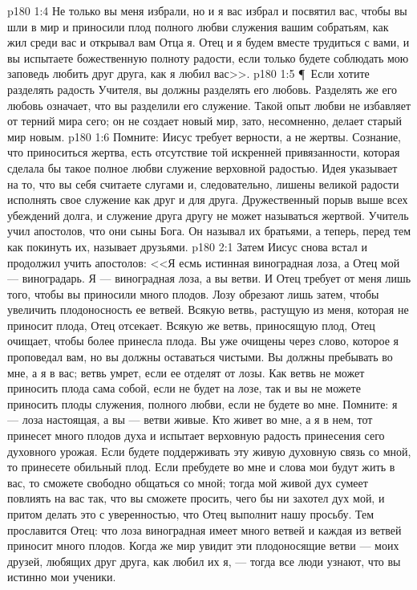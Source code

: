 \vs p180 1:4 Не только вы меня избрали, но и я вас избрал и посвятил вас, чтобы вы шли в мир и приносили плод полного любви служения вашим собратьям, как жил среди вас и открывал вам Отца я. Отец и я будем вместе трудиться с вами, и вы испытаете божественную полноту радости, если только будете соблюдать мою заповедь любить друг друга, как я любил вас>>.
\vs p180 1:5 \P\ Если хотите разделять радость Учителя, вы должны разделять его любовь. Разделять же его любовь означает, что вы разделили его служение. Такой опыт любви не избавляет от терний мира сего; он не создает новый мир, зато, несомненно, делает старый мир новым.
\vs p180 1:6 Помните: Иисус требует верности, а не жертвы. Сознание, что приноситься жертва, есть отсутствие той искренней привязанности, которая сделала бы такое полное любви служение верховной радостью. Идея  указывает на то, что вы себя считаете слугами и, следовательно, лишены великой радости исполнять свое служение как друг и для друга. Дружественный порыв выше всех убеждений долга, и служение друга другу не может называться жертвой. Учитель учил апостолов, что они сыны Бога. Он называл их братьями, а теперь, перед тем как покинуть их, называет друзьями.
\vs p180 2:1 Затем Иисус снова встал и продолжил учить апостолов: <<Я есмь истинная виноградная лоза, а Отец мой --- виноградарь. Я --- виноградная лоза, а вы ветви. И Отец требует от меня лишь того, чтобы вы приносили много плодов. Лозу обрезают лишь затем, чтобы увеличить плодоносность ее ветвей. Всякую ветвь, растущую из меня, которая не приносит плода, Отец отсекает. Всякую же ветвь, приносящую плод, Отец очищает, чтобы более принесла плода. Вы уже очищены через слово, которое я проповедал вам, но вы должны оставаться чистыми. Вы должны пребывать во мне, а я в вас; ветвь умрет, если ее отделят от лозы. Как ветвь не может приносить плода сама собой, если не будет на лозе, так и вы не можете приносить плоды служения, полного любви, если не будете во мне. Помните: я --- лоза настоящая, а вы --- ветви живые. Кто живет во мне, а я в нем, тот принесет много плодов духа и испытает верховную радость принесения сего духовного урожая. Если будете поддерживать эту живую духовную связь со мной, то принесете обильный плод. Если пребудете во мне и слова мои будут жить в вас, то сможете свободно общаться со мной; тогда мой живой дух сумеет повлиять на вас так, что вы сможете просить, чего бы ни захотел дух мой, и притом делать это с уверенностью, что Отец выполнит нашу просьбу. Тем прославится Отец: что лоза виноградная имеет много ветвей и каждая из ветвей приносит много плодов. Когда же мир увидит эти плодоносящие ветви --- моих друзей, любящих друг друга, как любил их я, --- тогда все люди узнают, что вы истинно мои ученики.
